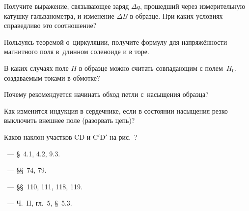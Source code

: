 \begin{lab:questions}

	\item Получите выражение, связывающее заряд $\Delta q$, прошедший через
    измерительную катушку гальванометра, и изменение $\Delta B$ в образце.
    При каких условиях справедливо это соотношение?

	\item Пользуясь теоремой о~циркуляции, получите формулу для напряжённости
магнитного поля в~длинном соленоиде и в торе.

    \item В каких случаях поле $H$ в образце можно считать совпадающим
    с полем~$H_0$, создаваемым токами в обмотке?

    \item Почему рекомендуется начинать обход петли с~насыщения образца?

    \item Как изменится индукция в сердечнике, если в состоянии насыщения
    резко выключить внешнее поле (разорвать цепь)?
    
    \item Каков наклон участков CD и C$'$D$'$ на рис.~?
    
\end{lab:questions}


\begin{lab:literature}
    \item \Kirichenko~--- \S~4.1, 4.2, 9.3.

	\item \SivuhinIII~--- \S\S~74, 79.

	\item \Kalashnikov~--- \S\S~110, 111, 118, 119.

	\item \KingLokOlh~--- Ч.~II, гл.~5, \S~5.3.
    

\end{lab:literature}
